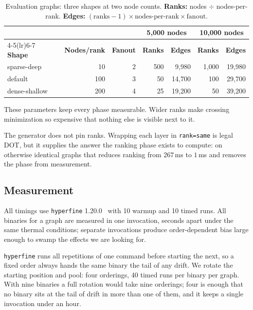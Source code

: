 \begin{table}[htbp]
\centering
\caption{Evaluation graphs: three shapes at two node counts.
\textbf{Ranks:} nodes $\div$ nodes-per-rank.
\textbf{Edges:} $(\text{ranks} - 1) \times \text{nodes-per-rank} \times \text{fanout}$.}
\label{tab:graphs}
\begin{tabular}{lrrrrrr}
\toprule
& & & \multicolumn{2}{c}{\textbf{5{,}000 nodes}} & \multicolumn{2}{c}{\textbf{10{,}000 nodes}} \\
\cmidrule(lr){4-5}\cmidrule(lr){6-7}
\textbf{Shape} & \textbf{Nodes/rank} & \textbf{Fanout} & \textbf{Ranks} & \textbf{Edges} & \textbf{Ranks} & \textbf{Edges} \\
\midrule
sparse-deep   & 10  & 2 & 500 & 9{,}980  & 1{,}000 & 19{,}980 \\
default       & 100 & 3 & 50  & 14{,}700 & 100     & 29{,}700 \\
dense-shallow & 200 & 4 & 25  & 19{,}200 & 50      & 39{,}200 \\
\bottomrule
\end{tabular}
\end{table}

These parameters keep every phase measurable. Wider ranks make crossing
minimization so expensive that nothing else is visible next to it.

The generator does not pin ranks. Wrapping each layer in \texttt{rank=same} is
legal DOT, but it supplies the answer the ranking phase exists to compute: on
otherwise identical graphs that reduces ranking from $267$\,ms to $1$\,ms and
removes the phase from measurement.

\subsection{Measurement}

All timings use \texttt{hyperfine} 1.20.0~\cite{peter2023hyperfine} with 10
warmup and 10 timed runs. All binaries for a graph are measured in one
invocation, seconds apart under the same thermal conditions; separate
invocations produce order-dependent bias large enough to swamp the effects we
are looking for.

\texttt{hyperfine} runs all repetitions of one command before starting the next,
so a fixed order always hands the same binary the tail of any drift. We rotate
the starting position and pool: four orderings, 40 timed runs per binary per
graph. With nine binaries a full rotation would take nine orderings; four is
enough that no binary sits at the tail of drift in more than one of them, and it
keeps a single invocation under an hour.

